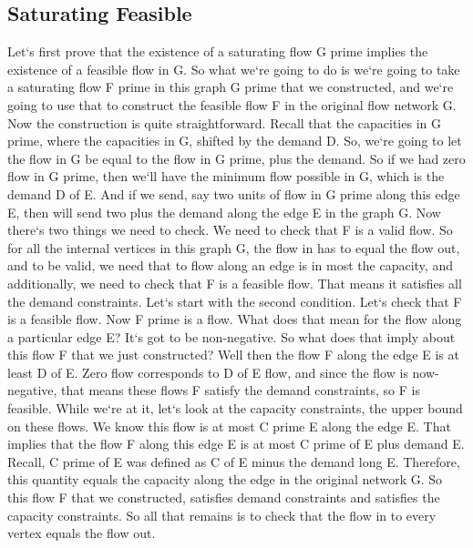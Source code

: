 \subsection{Saturating Feasible}
Let`s first prove that the existence of a saturating flow G prime implies the existence of a feasible flow in G\@.
So what we`re going to do is we`re going to take a saturating flow F prime in this graph G prime that we constructed, and we`re going to use that to construct the feasible flow F in the original flow network G\@.
Now the construction is quite straightforward.
Recall that the capacities in G prime, where the capacities in G, shifted by the demand D\@.
So, we`re going to let the flow in G be equal to the flow in G prime, plus the demand.
So if we had zero flow in G prime, then we`ll have the minimum flow possible in G, which is the demand D of E\@.
And if we send, say two units of flow in G prime along this edge E, then will send two plus the demand along the edge E in the graph G\@.
Now there`s two things we need to check.
We need to check that F is a valid flow.
So for all the internal vertices in this graph G, the flow in has to equal the flow out, and to be valid, we need that to flow along an edge is in most the capacity, and additionally, we need to check that F is a feasible flow.
That means it satisfies all the demand constraints.
Let`s start with the second condition.
Let`s check that F is a feasible flow.
Now F prime is a flow.
What does that mean for the flow along a particular edge E? It`s got to be non-negative.
So what does that imply about this flow F that we just constructed? Well then the flow F along the edge E is at least D of E\@.
Zero flow corresponds to D of E flow, and since the flow is now-negative, that means these flows F satisfy the demand constraints, so F is feasible.
While we`re at it, let`s look at the capacity constraints, the upper bound on these flows.
We know this flow is at most C prime E along the edge E\@.
That implies that the flow F along this edge E is at most C prime of E plus demand E\@.
Recall, C prime of E was defined as C of E minus the demand long E\@.
Therefore, this quantity equals the capacity along the edge in the original network G\@.
So this flow F that we constructed, satisfies demand constraints and satisfies the capacity constraints.
So all that remains is to check that the flow in to every vertex equals the flow out.

